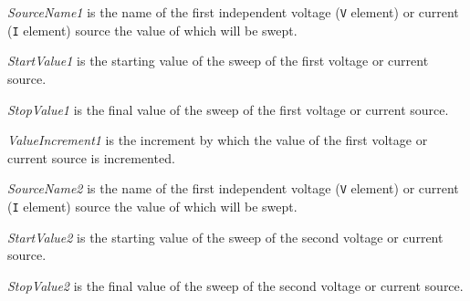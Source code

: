 \begin{widelist}
\item[{\it SourceName1}] is the name of the first independent voltage
({\tt V} element) or current ({\tt I} element) source the value of which will be
swept.

\item[{\it StartValue1}] is the starting value of the sweep of the first
voltage or current source.

\item[{\it StopValue1}] is the final value of the sweep of the first
voltage or current source.

\item[{\it ValueIncrement1}] is the increment by which the value of the first
voltage or current source is incremented.

\item[{\it SourceName2}] is the name of the first independent voltage
({\tt V} element) or current ({\tt I} element) source the value of which will be
swept.

\item[{\it StartValue2}] is the starting value of the sweep of the second
voltage or current source.

\item[{\it StopValue2}] is the final value of the sweep of the second
voltage or current source.
\end{widelist}

